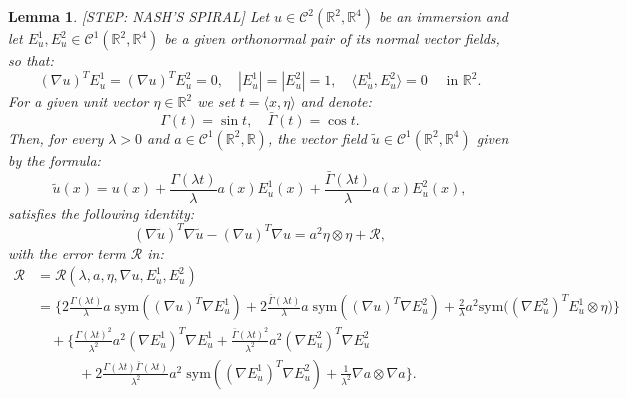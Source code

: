 \documentclass[reqno,twoside,11pt]{amsart}
\newcommand{\sym}{\mathrm{sym}}
\newcommand{\R}{\mathbb{R}}
\numberwithin{equation}{section}
\theoremstyle{plain}
\newtheorem{lemma}[theorem]{Lemma}
\theoremstyle{definition}
\begin{document}
\begin{lemma}\label{lem_step1}\textup{[STEP: NASH'S SPIRAL]}
Let $u\in\mathcal{C}^2(\R^2,\R^4)$ be an immersion and let $E_u^1,
E_u^2\in\mathcal{C}^{1}(\R^2, \R^4)$ be a given orthonormal pair of its normal
vector fields, so that:
$$(\nabla u)^T E_u^1 = (\nabla u)^T E_u^2 = 0,\quad |E^1_u|=|E^2_u|=1,
\quad \langle E^1_u, E^2_u\rangle = 0 \quad\mbox{ in } \R^2.$$
For a given unit vector $\eta\in\R^2$ we set $t=\langle x, \eta\rangle$ and denote:
$$\Gamma(t) = \sin t, \quad \bar\Gamma(t) = \cos t.$$
Then, for every $\lambda>0$ and $a\in\mathcal{C}^1(\R^2, \R)$, the
vector field $\tilde u\in \mathcal{C}^1(\R^2, \R^4)$ given by the formula:
$$\tilde u(x) = u(x)+ \frac{\Gamma(\lambda t )}{\lambda} a(x) E^1_u(x) + 
\frac{\bar\Gamma(\lambda t )}{\lambda}a(x)E^2_u(x),$$ 
satisfies the following identity:
\begin{equation*}
(\nabla \tilde u)^T\nabla \tilde u - (\nabla u)^T\nabla u =
a^2\eta\otimes \eta + \mathcal{R},
\end{equation*}
with the error term $\mathcal{R}$ in:
\begin{equation*}
\begin{split}
\mathcal{R} & = \mathcal{R}(\lambda, a, \eta, \nabla u,  E^1_u, E^2_u)
\\ & = \Big\{ 2\frac{\Gamma(\lambda t)}{\lambda} a \;\sym((\nabla u)^T\nabla E_u^1)
+ 2\frac{\bar\Gamma(\lambda t)}{\lambda} a \;\sym((\nabla u)^T\nabla E_u^2)
+\frac{2}{\lambda} a^2\sym\big((\nabla E^2_u)^TE_u^1\otimes\eta\big)\Big\}
\\ & \quad + \Big\{\frac{\Gamma(\lambda t)^2}{\lambda^2} a^2 (\nabla E^1_u)^T\nabla E_u^1
+ \frac{\bar\Gamma(\lambda t)^2}{\lambda^2} a^2 (\nabla E^2_u)^T\nabla E_u^2
\\ & \qquad\quad
+ 2 \frac{\Gamma(\lambda t)\bar\Gamma(\lambda t)}{\lambda^2}
a^2\; \sym((\nabla E^1_u)^T\nabla E_u^2)
+ \frac{1}{\lambda^2}\nabla a\otimes \nabla a\Big\}.
\end{split}
\end{equation*}
\end{lemma}
\end{document}
